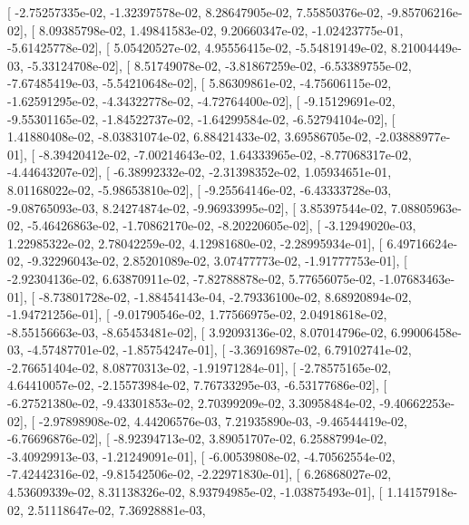 \documentclass{article}
\begin{document}
       [ -2.75257335e-02,  -1.32397578e-02,   8.28647905e-02,
          7.55850376e-02,  -9.85706216e-02],
       [  8.09385798e-02,   1.49841583e-02,   9.20660347e-02,
         -1.02423775e-01,  -5.61425778e-02],
       [  5.05420527e-02,   4.95556415e-02,  -5.54819149e-02,
          8.21004449e-03,  -5.33124708e-02],
       [  8.51749078e-02,  -3.81867259e-02,  -6.53389755e-02,
         -7.67485419e-03,  -5.54210648e-02],
       [  5.86309861e-02,  -4.75606115e-02,  -1.62591295e-02,
         -4.34322778e-02,  -4.72764400e-02],
       [ -9.15129691e-02,  -9.55301165e-02,  -1.84522737e-02,
         -1.64299584e-02,  -6.52794104e-02],
       [  1.41880408e-02,  -8.03831074e-02,   6.88421433e-02,
          3.69586705e-02,  -2.03888977e-01],
       [ -8.39420412e-02,  -7.00214643e-02,   1.64333965e-02,
         -8.77068317e-02,  -4.44643207e-02],
       [ -6.38992332e-02,  -2.31398352e-02,   1.05934651e-01,
          8.01168022e-02,  -5.98653810e-02],
       [ -9.25564146e-02,  -6.43333728e-03,  -9.08765093e-03,
          8.24274874e-02,  -9.96933995e-02],
       [  3.85397544e-02,   7.08805963e-02,  -5.46426863e-02,
         -1.70862170e-02,  -8.20220605e-02],
       [ -3.12949020e-03,   1.22985322e-02,   2.78042259e-02,
          4.12981680e-02,  -2.28995934e-01],
       [  6.49716624e-02,  -9.32296043e-02,   2.85201089e-02,
          3.07477773e-02,  -1.91777753e-01],
       [ -2.92304136e-02,   6.63870911e-02,  -7.82788878e-02,
          5.77656075e-02,  -1.07683463e-01],
       [ -8.73801728e-02,  -1.88454143e-04,  -2.79336100e-02,
          8.68920894e-02,  -1.94721256e-01],
       [ -9.01790546e-02,   1.77566975e-02,   2.04918618e-02,
         -8.55156663e-03,  -8.65453481e-02],
       [  3.92093136e-02,   8.07014796e-02,   6.99006458e-03,
         -4.57487701e-02,  -1.85754247e-01],
       [ -3.36916987e-02,   6.79102741e-02,  -2.76651404e-02,
          8.08770313e-02,  -1.91971284e-01],
       [ -2.78575165e-02,   4.64410057e-02,  -2.15573984e-02,
          7.76733295e-03,  -6.53177686e-02],
       [ -6.27521380e-02,  -9.43301853e-02,   2.70399209e-02,
          3.30958484e-02,  -9.40662253e-02],
       [ -2.97898908e-02,   4.44206576e-03,   7.21935890e-03,
         -9.46544419e-02,  -6.76696876e-02],
       [ -8.92394713e-02,   3.89051707e-02,   6.25887994e-02,
         -3.40929913e-03,  -1.21249091e-01],
       [ -6.00539808e-02,  -4.70562554e-02,  -7.42442316e-02,
         -9.81542506e-02,  -2.22971830e-01],
       [  6.26868027e-02,   4.53609339e-02,   8.31138326e-02,
          8.93794985e-02,  -1.03875493e-01],
       [  1.14157918e-02,   2.51118647e-02,   7.36928881e-03,
\end{document}
